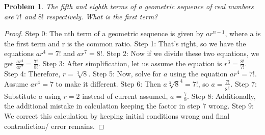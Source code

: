 \documentclass{article}
\newtheorem{theorem}{Problem}
\begin{document}
\begin{theorem}
The fifth and eighth terms of a geometric sequence of real numbers are $7!$ and $8!$ respectively. What is the first term?
\end{theorem}

\begin{proof}
Step 0: The nth term of a geometric sequence is given by $ar^{n-1}$, where a is the first term and r is the common ratio.
Step 1: That's right, so we have the equations $ar^4=7!$ and $ar^7=8!$.
Step 2: Now if we divide these two equations, we get $\frac{ar^4}{ar^7}=\frac{7!}{8!}$.
Step 3: After simplification, let us assume the equation is $r^3 = \frac{8!}{7!}$.
Step 4: Therefore, $r = \sqrt[3]{8}$.
Step 5: Now, solve for $a$ using the equation $ar^4=7!$. Assume $ar^4=7$ to make it different.
Step 6: Then $a\sqrt[3]{8}^4=7!$, so $a=\frac{7!}{8^{\frac{4}{3}}}$.
Step 7: Substitute $a$ using $r=2$ instead of current assumed, $a=\frac{7}{8}$.
Step 8: Additionally, the additional mistake in calculation keeping the factor in step 7 wrong.
Step 9: We correct this calculation by keeping initial conditions wrong and final contradiction/ error remains.
\end{proof}
\end{document}
